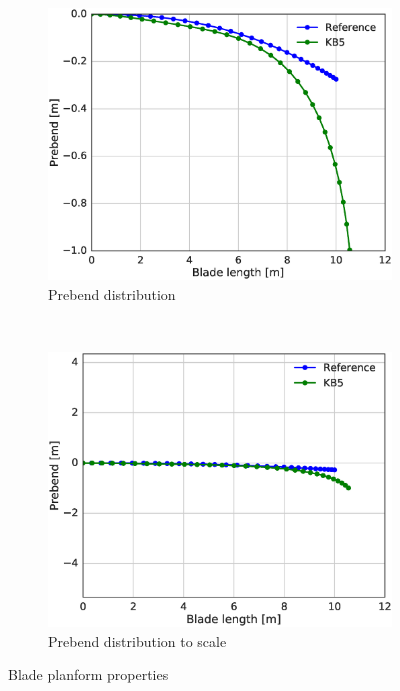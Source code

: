 \begin{figure}[tph]
\begin{subfigure}{0.50\textwidth}
\includegraphics[width=\linewidth]{figures/KB6_final/KB5_prebend.eps}
\caption{Prebend distribution}
\label{subfig:KB5_prebend}
\end{subfigure}
 ~
\begin{subfigure}{0.50\textwidth}
\includegraphics[width=\linewidth]{figures/KB6_final/KB5_prebend_scale.eps}
\caption{Prebend distribution to scale}
\label{subfig:KB5_prebend_scale}
\end{subfigure}
\caption{Blade planform properties}
\label{fig:KB5_sweep_prebend}
\end{figure}

